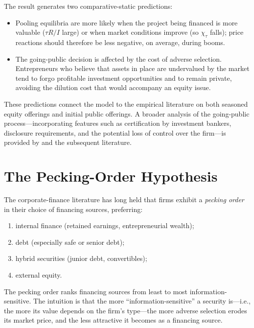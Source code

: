 \documentclass[11pt,a4paper,oneside]{book}
\theoremstyle{plain}
\theoremstyle{definition}
\theoremstyle{remark}
\numberwithin{equation}{chapter}
\begin{document}
The result generates two comparative-static predictions:
\begin{itemize}
  \item Pooling equilibria are more likely when the project being financed is more valuable ($\tau R/I$ large) or when market conditions improve (so $\chi_\tau$ falls); price reactions should therefore be less negative, on average, during booms.
  \item The going-public decision is affected by the cost of adverse selection.
  Entrepreneurs who believe that assets in place are undervalued by the market tend to forgo profitable investment opportunities and to remain private, avoiding the dilution cost that would accompany an equity issue.
\end{itemize}

These predictions connect the model to the empirical literature on both seasoned equity offerings and initial public offerings.
A broader analysis of the going-public process---incorporating features such as certification by investment bankers, disclosure requirements, and the potential loss of control over the firm---is provided by \citet{ChemmanurFulghieri1999} and the subsequent literature.

\section{The Pecking-Order Hypothesis}
\label{sec:lemons-pecking}

The corporate-finance literature has long held that firms exhibit a \emph{pecking order} in their choice of financing sources, preferring:
\begin{enumerate}
  \item internal finance (retained earnings, entrepreneurial wealth);
  \item debt (especially safe or senior debt);
  \item hybrid securities (junior debt, convertibles);
  \item external equity.
\end{enumerate}
The pecking order ranks financing sources from least to most information-sensitive.
The intuition is that the more ``information-sensitive'' a security is---i.e., the more its value depends on the firm's type---the more adverse selection erodes its market price, and the less attractive it becomes as a financing source.
\end{document}
